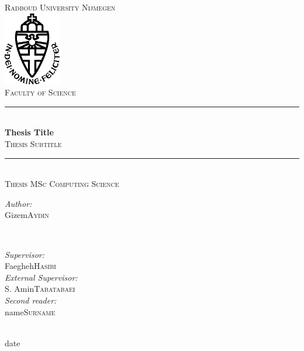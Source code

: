 \documentclass{report}
\title{\thesistitle}
\author{\thesisauthorfirst\space\thesisauthorsecond}
\date{\thesisdate}
\def\thesistitle{Thesis Title}
\def\thesissubtitle{Thesis Subtitle}
\def\thesisauthorfirst{Gizem}
\def\thesisauthorsecond{Aydin}
\def\thesissupervisorfirst{Faegheh}
\def\thesissupervisorsecond{Hasibi}
\def\extthesissupervisorfirst{S. Amin}
\def\extthesissupervisorsecond{Tabatabaei}
\def\thesissecondreaderfirst{name}
\def\thesissecondreadersecond{Surname}
\def\thesisdate{date}
\theoremstyle{definition}
\theoremstyle{remark}
\begin{document}
\begin{titlepage}
	\thispagestyle{empty}
	\newcommand{\HRule}{\rule{\linewidth}{0.5mm}}
	\center
	\textsc{\Large Radboud University Nijmegen}\\[.7cm]
	\includegraphics[width=25mm]{img/in_dei_nomine_feliciter.eps}\\[.5cm]
	\textsc{Faculty of Science}\\[0.5cm]
	
	\HRule \\[0.4cm]
	{ \huge \bfseries \thesistitle}\\[0.1cm]
	\textsc{\thesissubtitle}\\
	\HRule \\[.5cm]
	\textsc{\large Thesis MSc Computing Science}\\[.5cm]
	
	\begin{minipage}{0.4\textwidth}
	\begin{flushleft} \large
	\emph{Author:}\\
	\thesisauthorfirst\space \textsc{\thesisauthorsecond}
	\end{flushleft}
	\end{minipage}
	~
	\begin{minipage}{0.4\textwidth}
	\begin{flushright} \large
	\emph{Supervisor:} \\
	\thesissupervisorfirst\space \textsc{\thesissupervisorsecond} \\[1em]
	\emph{External Supervisor:} \\
	\extthesissupervisorfirst\space \textsc{\extthesissupervisorsecond} \\[1em]
	\emph{Second reader:} \\
	\thesissecondreaderfirst\space \textsc{\thesissecondreadersecond}
	\end{flushright}
	\end{minipage}\\[4cm]
	\vfill
	{\large \thesisdate}\\
	\clearpage
\end{titlepage}

\tableofcontents
\end{document}
